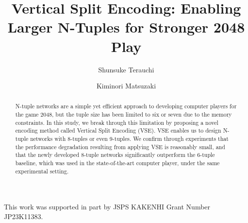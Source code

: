 \documentclass[runningheads]{llncs}
\begin{document}
%
\title{Vertical Split Encoding: Enabling Larger N-Tuples for Stronger 2048 Play}
%
%
\author{Shunsuke Terauchi \and %
Kiminori Matsuzaki}
%
%
%
\maketitle              %
%
\begin{abstract}
N-tuple networks are a simple yet efficient approach to developing computer players for the game 2048,
but the tuple size has been limited to six or seven due to the memory constraints.
In this study, we break through this limitation by proposing a novel encoding method called Vertical Split Encoding (VSE).  VSE enables us to design N-tuple networks with 8-tuples or even 9-tuples.
We confirm through experiments that the performance degradation resulting from applying VSE is reasonably small, and that the newly developed 8-tuple networks significantly outperform the 6-tuple baseline, which was used in the state-of-the-art computer player, under the same experimental setting.

\end{abstract}
%
%
%






% 


\subsubsection{\ackname} This work was supported in part by JSPS KAKENHI Grant Number JP23K11383.

% 
% 

\end{document}
